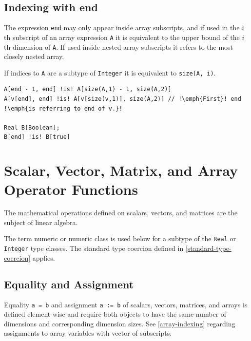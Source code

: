\subsection{Indexing with end}\label{indexing-with-end}

The expression \lstinline!end! may only appear inside array subscripts, and if used in the $i$th subscript of an array expression \lstinline!A! it is equivalent to the upper bound of the $i$th dimension of \lstinline!A!.
If used inside nested array subscripts it refers to the most closely nested array.

\begin{nonnormative}
If indices to \lstinline!A! are a subtype of \lstinline!Integer! it is equivalent to \lstinline!size(A, i)!.
\end{nonnormative}

\begin{example}
\begin{lstlisting}[language=modelica, escapechar=!]
A[end - 1, end] !is! A[size(A,1) - 1, size(A,2)]
A[v[end], end] !is! A[v[size(v,1)], size(A,2)] // !\emph{First}! end !\emph{is referring to end of v.}!

Real B[Boolean];
B[end] !is! B[true]
\end{lstlisting}
\end{example}

\section{Scalar, Vector, Matrix, and Array Operator Functions}\label{scalar-vector-matrix-and-array-operator-functions}

The mathematical operations defined on scalars, vectors, and matrices are the subject of linear algebra.

The term numeric or numeric class is used below for a subtype of the \lstinline!Real! or \lstinline!Integer! type classes.
The standard type coercion defined in \cref{standard-type-coercion} applies.

\subsection{Equality and Assignment}\label{equality-and-assignment}

Equality \lstinline!a = b! and assignment \lstinline!a := b! of scalars, vectors, matrices, and arrays is defined element-wise and require both objects to have the same number of dimensions and corresponding dimension sizes.
See \cref{array-indexing} regarding assignments to array variables with vector of subscripts.

